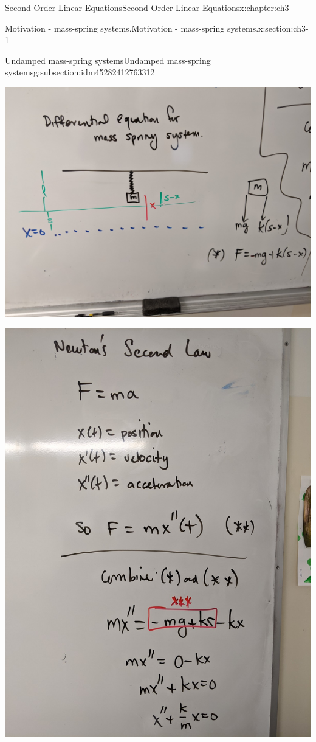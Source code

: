 \documentclass[oneside,10pt,]{book}
\numberwithin{equation}{section}
\numberwithin{equation}{section}
\begin{document}
\begin{chapterptx}{Second Order Linear Equations}{}{Second Order Linear Equations}{}{}{x:chapter:ch3}
\begin{sectionptx}{Motivation - mass-spring systems.}{}{Motivation - mass-spring systems.}{}{}{x:section:ch3-1}
\begin{subsectionptx}{Undamped mass-spring systems}{}{Undamped mass-spring systems}{}{}{g:subsection:idm45282412763312}
\begin{image}{0}{1}{0}
\includegraphics[width=\linewidth]{images/spring_diff_1.jpg}
\end{image}%
\begin{image}{0}{1}{0}%
\includegraphics[width=\linewidth]{images/spring_diff_2.jpg}

\end{image}
\end{subsectionptx}
\end{sectionptx}
\end{chapterptx}
\end{document}

